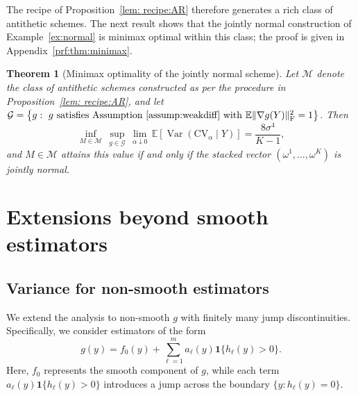 \documentclass[12pt]{article}
\newtheorem{theorem}{Theorem}[section]
\def\E{\mathbb{E}}
\theoremstyle{general}
\newcommand{\cv}{{\mathrm{CV}}}
\begin{document}
The recipe of Proposition~\ref{lem: recipe:AR} therefore generates a rich class of antithetic schemes. The next result shows that the jointly normal construction of Example~\ref{ex:normal} is minimax optimal within this class; the proof is given in Appendix~\ref{prf:thm:minimax}.


\begin{theorem}[Minimax optimality of the jointly normal scheme]
\label{thm:minimax}
Let $\mathcal M$ denote the class of antithetic schemes constructed as per the procedure in Proposition~\ref{lem: recipe:AR}, and let
$\mathcal G=\left\{
g:\ g\text{ satisfies Assumption~\ref{assump:weakdiff} with }  \mathbb E\|\nabla g(Y)\|_{\mathrm F}^2=1\right\}$.
Then
\[
\inf_{M\in\mathcal M}\,
\sup_{g\in\mathcal G}\,
\lim_{\alpha\downarrow0}\,
\E \left[\operatorname{Var}(\cv_\alpha\mid Y)\right]=\frac{8\sigma^4}{K-1},
\]
and $M\in\mathcal M$ attains this value if and only if the stacked vector $(\omega^1,\ldots,\omega^K)$ is jointly normal.
\end{theorem}



\section{Extensions beyond smooth estimators}
\label{sec: nonsmooth}



\subsection{Variance for non-smooth estimators}

We extend the analysis to non-smooth $g$ with finitely many jump discontinuities. Specifically, we consider estimators of the form
\begin{equation}
\label{equ:nonsmooth:g}
g(y)
=
f_0(y)
+
\sum_{\ell=1}^m
a_\ell(y)\mathbf 1\{h_\ell(y)>0\}.
\end{equation}
Here, $f_0$ represents the smooth component of $g$, while each term $a_\ell(y)\mathbf{1}\{h_\ell(y)>0\}$ introduces a jump across the boundary $\{y:h_\ell(y)=0\}$.
\end{document}
